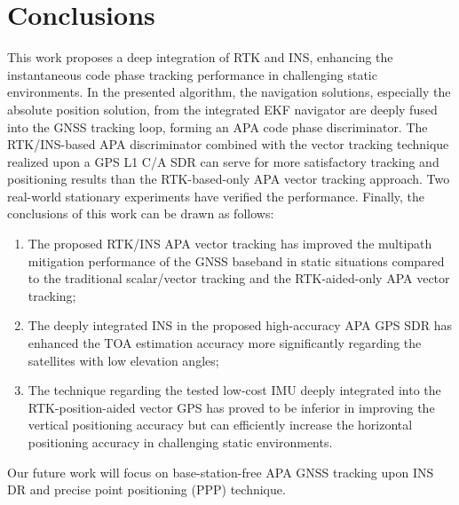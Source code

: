 \documentclass{article}
\begin{document}
\section{Conclusions}\label{sec4}
This work proposes a deep integration of RTK and INS, enhancing the instantaneous code phase tracking performance in challenging static environments. In the presented algorithm, the navigation solutions, especially the absolute position solution, from the integrated EKF navigator are deeply fused into the GNSS tracking loop, forming an APA code phase discriminator. The RTK/INS-based APA discriminator combined with the vector tracking technique realized upon a GPS L1 C/A SDR can serve for more satisfactory tracking and positioning results than the RTK-based-only APA vector tracking approach. Two real-world stationary experiments have verified the performance. Finally, the conclusions of this work can be drawn as follows: 

\begin{enumerate}
\item  The proposed RTK/INS APA vector tracking has improved the multipath mitigation performance of the GNSS baseband in static situations compared to the traditional scalar/vector tracking and the RTK-aided-only APA vector tracking; 

\item  The deeply integrated INS in the proposed high-accuracy APA GPS SDR has enhanced the TOA estimation accuracy more significantly regarding the satellites with low elevation angles; 

\item  The technique regarding the tested low-cost IMU deeply integrated into the RTK-position-aided vector GPS has proved to be inferior in improving the vertical positioning accuracy but can efficiently increase the horizontal positioning accuracy in challenging static environments. 
\end{enumerate}

Our future work will focus on base-station-free APA GNSS tracking upon INS DR and precise point positioning (PPP) technique. 





\end{document}
